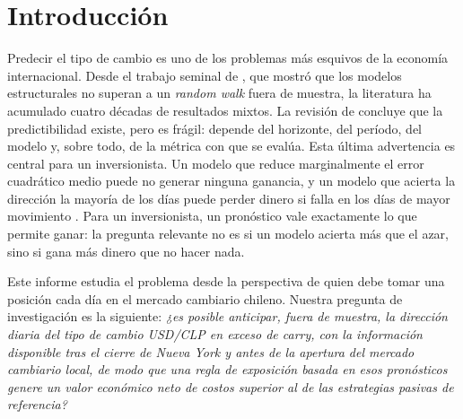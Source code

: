 \documentclass[11pt,a4paper]{article}
\begin{document}
\newpage


\section{Introducción}\label{sec:intro}

Predecir el tipo de cambio es uno de los problemas más esquivos de la economía internacional. Desde el trabajo seminal de \citet{meese1983}, que mostró que los modelos estructurales no superan a un \emph{random walk} fuera de muestra, la literatura ha acumulado cuatro décadas de resultados mixtos. La revisión de \citet{rossi2013} concluye que la predictibilidad existe, pero es frágil: depende del horizonte, del período, del modelo y, sobre todo, de la métrica con que se evalúa. Esta última advertencia es central para un inversionista. Un modelo que reduce marginalmente el error cuadrático medio puede no generar ninguna ganancia, y un modelo que acierta la dirección la mayoría de los días puede perder dinero si falla en los días de mayor movimiento \citep{gonzalez2026}. Para un inversionista, un pronóstico vale exactamente lo que permite ganar: la pregunta relevante no es si un modelo acierta más que el azar, sino si gana más dinero que no hacer nada.

Este informe estudia el problema desde la perspectiva de quien debe tomar una posición cada día en el mercado cambiario chileno. Nuestra pregunta de investigación es la siguiente: \emph{¿es posible anticipar, fuera de muestra, la dirección diaria del tipo de cambio USD/CLP en exceso de carry, con la información disponible tras el cierre de Nueva York y antes de la apertura del mercado cambiario local, de modo que una regla de exposición basada en esos pronósticos genere un valor económico neto de costos superior al de las estrategias pasivas de referencia?}
\end{document}
